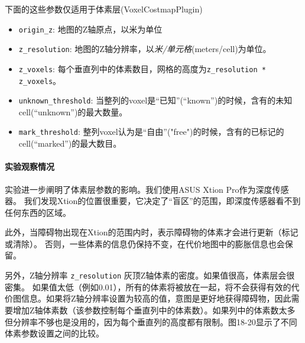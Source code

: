 下面的这些参数仅适用于体素层(VoxelCostmapPlugin)
\begin{itemize}
	\item \texttt{origin_z}: 
	地图的Z轴原点，以米为单位
	\item \texttt{z_resolution}: 
	地图的Z轴分辨率，以\emph{米/单元格}(meters/cell)为单位。
	
	\item \texttt{z_voxels}: 
	每个垂直列中的体素数目，网格的高度为\texttt{z_resolution * z_voxels}。
	
	\item \texttt{unknown_threshold}: 
	当整列的voxel是“已知”(``known'')的时候，含有的未知cell(“unknown”)的最大数量。
	
	\item \texttt{mark_threshold}: 
	整列voxel认为是“自由”("free")的时候，含有的已标记的cell(“marked”)的最大数目。
	
\end{itemize}

\paragraph[Experiment observations]{实验观察情况}%

实验进一步阐明了体素层参数的影响。我们使用ASUS Xtion Pro作为深度传感器。 我们发现Xtion的位置很重要，它决定了“盲区”的范围，即深度传感器看不到任何东西的区域。

此外，当障碍物出现在Xtion的范围内时，表示障碍物的体素才会进行更新（标记或清除）。
否则，一些体素的信息仍保持不变，在代价地图中的膨胀信息也会保留。

另外，Z轴分辨率 \texttt{z_resolution} 灰顶Z轴体素的密度。如果值很高，体素层会很密集。
如果值太低（例如0.01），所有的体素将被放在一起，将不会获得有效的代价图信息。如果将Z轴分辨率设置为较高的值，意图是更好地获得障碍物，因此需要增加Z轴体素数（该参数控制每个垂直列中的体素数）。如果列中的体素数太多但分辨率不够也是没用的，因为每个垂直列的高度都有限制。图18-20显示了不同体素参数设置之间的比较。

